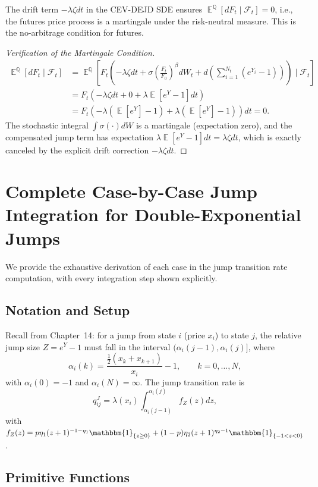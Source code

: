 \documentclass[11pt,a4paper,openany]{book}
\theoremstyle{definition}
\theoremstyle{plain}
\theoremstyle{remark}
\DeclareMathOperator{\E}{\mathbb{E}}
\newcommand{\1}{\mathbbm{1}}
\newcommand{\F}{\mathcal{F}}
\newcommand{\Q}{\mathbb{Q}}
\begin{document}
The drift term $-\lambda \zeta dt$ in the CEV-DEJD SDE ensures $\E^{\Q}[dF_{t} \mid \F_{t}] = 0$, i.e., the futures price process is a martingale under the risk-neutral measure. This is the no-arbitrage condition for futures.

\begin{proof}[Verification of the Martingale Condition]
\[
\begin{aligned}
\E^{\Q}[dF_{t} \mid \F_{t}] &= \E^{\Q}\left[F_{t}\left(-\lambda \zeta dt + \sigma\left(\frac{F_{t}}{F_{0}}\right)^{\beta} dW_{t} + d\left(\sum_{i=1}^{N_{t}}(e^{Y_{i}}-1)\right)\right) \mid \F_{t}\right] \\
&= F_{t}\left(-\lambda \zeta dt + 0 + \lambda \E[e^{Y} - 1] dt\right) \\
&= F_{t}\left(-\lambda(\E[e^{Y}] - 1) + \lambda(\E[e^{Y}] - 1)\right) dt = 0.
\end{aligned}
\]
The stochastic integral $\int \sigma(\cdot) dW$ is a martingale (expectation zero), and the compensated jump term has expectation $\lambda \E[e^{Y}-1] dt = \lambda \zeta dt$, which is exactly canceled by the explicit drift correction $-\lambda \zeta dt$.
\end{proof}

\chapter{Complete Case-by-Case Jump Integration for Double-Exponential Jumps}
\label{app:case-jump}

We provide the exhaustive derivation of each case in the jump transition rate computation, with every integration step shown explicitly.

\section{Notation and Setup}

Recall from Chapter~14: for a jump from state $i$ (price $x_{i}$) to state $j$, the relative jump size $Z = e^{Y} - 1$ must fall in the interval $(\alpha_{i}(j-1), \alpha_{i}(j)]$, where
\[
\alpha_{i}(k) = \frac{\frac{1}{2}(x_{k} + x_{k+1})}{x_{i}} - 1, \qquad k = 0, \ldots, N,
\]
with $\alpha_{i}(0) = -1$ and $\alpha_{i}(N) = \infty$. The jump transition rate is
\[
q_{ij}^{J} = \lambda(x_{i}) \int_{\alpha_{i}(j-1)}^{\alpha_{i}(j)} f_{Z}(z) dz,
\]
with $f_{Z}(z) = p \eta_{1} (z+1)^{-1-\eta_{1}} \1_{\{z \geq 0\}} + (1-p) \eta_{2} (z+1)^{\eta_{2}-1} \1_{\{-1 < z < 0\}}$.

\section{Primitive Functions}
\end{document}
